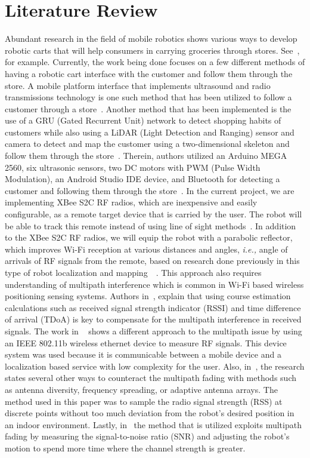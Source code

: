 \documentclass[letterpaper,12pt]{article}   %
\begin{document}
\section{Literature Review}
Abundant research in the field of mobile robotics shows various ways to develop robotic carts that will help consumers in carrying groceries through stores. See~\cite{Rawashdeh2017-Person,islam_lam_fukuda_kobayashi_kuno_2019,Sales2016-CompaRob}, for example. Currently, the work being done focuses on a few different methods of having a robotic cart interface with the customer and follow them through the store. A mobile platform interface that implements ultrasound and radio transmissions technology is one such method that has been utilized to follow a customer through a store~\cite{Sales2016-CompaRob}. Another method that has been implemented is the use of a GRU (Gated Recurrent Unit) network to detect shopping habits of customers while also using a LiDAR (Light Detection and Ranging) sensor and camera to detect and map the customer using a two-dimensional skeleton and follow them through the store~\cite{islam_lam_fukuda_kobayashi_kuno_2019}. Therein, authors utilized an Arduino MEGA 2560, six ultrasonic sensors, two DC motors with PWM (Pulse Width Modulation), an Android Studio IDE device, and Bluetooth for detecting a customer and following them through the store~\cite{Rawashdeh2017-Person}. In the current project, we are implementing XBee S2C RF radios, which are inexpensive and easily configurable, as a remote target device that is carried by the user. The robot will be able to track this remote instead of using line of sight methods~\cite{Miah2018-Intelligent}. In addition to the XBee S2C RF radios, we will equip the robot with a parabolic reflector, which improves Wi-Fi reception at various distances and angles, \textit{i.e.,} angle of arrivals of RF signals from the remote, based on research done previously in this type of robot localization and mapping~\cite{Miah2018-Intelligent}~\cite{Li2013ANA}. This approach also requires understanding of multipath interference which is common in Wi-Fi based wireless positioning sensing systems. Authors in~\cite{xie_jiang_zhao_zhang_2019}, explain that using course estimation calculations such as received signal strength indicator (RSSI) and time difference of arrival (TDoA) is key to compensate for the multipath interference in received signals. The work in ~\cite{ladd_bekris_rudys_kavraki_wallach_2005} shows a different approach to the multipath issue by using an IEEE 802.11b wireless ethernet device to measure RF signals. This device system was used because it is communicable between a mobile device and a localization based service with low complexity for the user. Also, in~\cite{lindhe_johansson_bicchi_2007}, the research states several other ways to counteract the multipath fading with methods such as antenna diversity, frequency spreading, or adaptive antenna arrays. The method used in this paper was to sample the radio signal strength (RSS) at discrete points without too much deviation from the robot's desired position in an indoor environment. Lastly, in~\cite{Lindhe2009} the method that is utilized exploits multipath fading by measuring the signal-to-noise ratio (SNR) and adjusting the robot's motion to spend more time where the channel strength is greater.
\end{document}
